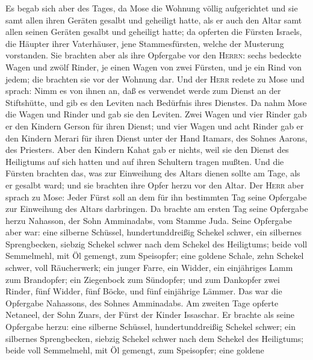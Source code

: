  Es begab sich aber des Tages, da Mose die Wohnung völlig
aufgerichtet und sie samt allen ihren Geräten gesalbt und geheiligt
hatte, als er auch den Altar samt allen seinen Geräten gesalbt und
geheiligt hatte;  da opferten die Fürsten Israels, die
Häupter ihrer Vaterhäuser, jene Stammesfürsten, welche der Musterung
vorstanden.  Sie brachten aber als ihre Opfergabe vor den
\textsc{Herrn}: sechs bedeckte Wagen und zwölf Rinder, je einen Wagen
von zwei Fürsten, und je ein Rind von jedem; die brachten sie vor der
Wohnung dar.  Und der \textsc{Herr} redete zu Mose und
sprach:  Nimm es von ihnen an, daß es verwendet werde zum
Dienst an der Stiftshütte, und gib es den Leviten nach Bedürfnis ihres
Dienstes.  Da nahm Mose die Wagen und Rinder und gab sie
den Leviten.  Zwei Wagen und vier Rinder gab er den
Kindern Gerson für ihren Dienst;  und vier Wagen und acht
Rinder gab er den Kindern Merari für ihren Dienst unter der Hand
Itamars, des Sohnes Aarons, des Priesters.  Aber den
Kindern Kahat gab er nichts, weil sie den Dienst des Heiligtums auf sich
hatten und auf ihren Schultern tragen mußten.  Und die
Fürsten brachten das, was zur Einweihung des Altars dienen sollte am
Tage, als er gesalbt ward; und sie brachten ihre Opfer herzu vor den
Altar.  Der \textsc{Herr} aber sprach zu Mose: Jeder
Fürst soll an dem für ihn bestimmten Tag seine Opfergabe zur Einweihung
des Altars darbringen.  Da brachte am ersten Tag seine
Opfergabe herzu Nahasson, der Sohn Amminadabs, vom Stamme Juda.
 Seine Opfergabe aber war: eine silberne Schüssel,
hundertunddreißig Schekel schwer, ein silbernes Sprengbecken, siebzig
Schekel schwer nach dem Schekel des Heiligtums; beide voll Semmelmehl,
mit Öl gemengt, zum Speisopfer;  eine goldene Schale,
zehn Schekel schwer, voll Räucherwerk;  ein junger Farre,
ein Widder, ein einjähriges Lamm zum Brandopfer;  ein
Ziegenbock zum Sündopfer;  und zum Dankopfer zwei Rinder,
fünf Widder, fünf Böcke, und fünf einjährige Lämmer. Das war die
Opfergabe Nahassons, des Sohnes Amminadabs.  Am zweiten
Tage opferte Netaneel, der Sohn Zuars, der Fürst der Kinder Issaschar.
 Er brachte als seine Opfergabe herzu: eine silberne
Schüssel, hundertunddreißig Schekel schwer; ein silbernes Sprengbecken,
siebzig Schekel schwer nach dem Schekel des Heiligtums; beide voll
Semmelmehl, mit Öl gemengt, zum Speisopfer;  eine goldene
